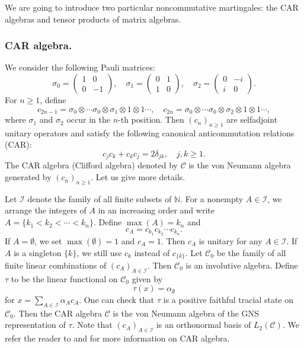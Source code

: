 \documentclass[oneside,english,a4wide]{amsart}
\numberwithin{equation}{section}
\numberwithin{figure}{section}
\theoremstyle{plain}
\theoremstyle{plain}
\theoremstyle{definition}
\theoremstyle{plain}
\theoremstyle{remark}
\theoremstyle{definition}
\theoremstyle{remark}
\theoremstyle{definition}
\newcommand{\8}{\infty}
\begin{document}
We are going to introduce two particular noncommutative martingales: the CAR algebras and tensor products of matrix algebras.



 \subsubsection{\textbf{CAR algebra.}}
We consider the following Pauli matrices:
\begin{equation*}
	\sigma_0=\begin{pmatrix}
		1&0\\0&-1
	\end{pmatrix},\quad
	\sigma_1=\begin{pmatrix}
		0&1\\1&0
	\end{pmatrix},\quad
	\sigma_2=\begin{pmatrix}
		0&-i\\i&0
	\end{pmatrix}.
\end{equation*}
For $n\ge 1$, define
\[c_{2n-1}=\sigma_0\otimes\cdots\sigma_0\otimes \sigma_1\otimes 1\otimes 1\cdots,\quad c_{2n}=\sigma_0\otimes\cdots\sigma_0\otimes \sigma_2\otimes 1\otimes 1\cdots,\]
where $\sigma_1$ and $\sigma_2$ occur in the $n$-th position. Then $(c_n)_{n\geq 1}$ are selfadjoint unitary operators and satisfy the following canonical anticommutation relations (CAR):
\begin{equation}\label{equa4.1}
	c_jc_k+c_kc_j=2\delta_{jk},\quad j,k\ge 1.
\end{equation}
The CAR algebra (Clifford algebra) denoted by $\mathcal{C}$ is the von Neumann algebra generated by $(c_n)_{n\ge 1}$. Let us give more details.

Let $\mathcal{I}$ denote the family of all finite subsets of $\mathbb{N}$. For a nonempty $A\in\mathcal{I}$, we arrange the integers of $A$ in an increasing order and write $A=\{k_1<k_2<\cdots<k_n\}$. Define $\max(A)=k_n$ and 
\[c_A=c_{k_1}c_{k_2}\cdots c_{k_n}.\]
If $A=\emptyset$, we set $\max(\emptyset)=1$ and $c_A=1$. Then $c_A$ is unitary for any $A\in\mathcal{I}$. If $A$ is a singleton $\{k\}$, we still use $c_k$ instead of $c_{\{k\}}$. Let $\mathcal{C}_0$ be the family of all finite linear combinations of $(c_A)_{A\in \mathcal{I}}$. Then $\mathcal{C}_0$ is an involutive algebra. Define $\tau$ to be the linear functional on $\mathcal{C}_0$ given by
\begin{equation}\label{tau}
	\tau(x)= \alpha_{\emptyset}
\end{equation} 
for $x=\sum\limits_{A\in \mathcal{I}} \alpha_A c_A$. One can check that $\tau$ is a positive faithful tracial state on $\mathcal{C}_0$. Then the CAR algebra $\mathcal{C}$ is the von Neumann algebra of the GNS representation of $\tau$. Note that $(c_A)_{A\in \mathcal{I}}$ is an orthonormal basis of $L_2(\mathcal{C})$. We refer the reader to \cite{Se} and \cite{PR} for more information on CAR algebra.
\end{document}
